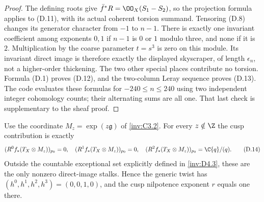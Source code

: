 \begin{proof}
The defining roots give $\bar f^*R=\OO_X(S_1-S_2)$, so the projection
formula applies to (D.11), with its actual coherent torsion summand.
Tensoring (D.8) changes its generator character from $-1$ to $n-1$.
There is exactly one invariant coefficient among exponents $0,1$ if
$n-1$ is $0$ or $1$ modulo three, and none if it is $2$. Multiplication
by the coarse parameter $t=s^3$ is zero on this module. Its invariant
direct image is therefore exactly the displayed skyscraper, of
length $\epsilon_n$, not a higher-order thickening. The two other
special places contribute no torsion. Formula (D.1) proves (D.12),
and the two-column Leray sequence proves (D.13). The code evaluates
these formulas for $-240\le n\le240$ using two independent integer
cohomology counts; their alternating sums are all one. That last
check is supplementary to the sheaf proof.
\end{proof}

\begin{proposition}\label{inv:D4.2}
Use the coordinate $M_z=\exp(z\mathfrak g)$ of \ref{inv:C3.2}. For every
$z\notin\Z$ the cusp contribution is exactly
\[
 (R^0f_*(T_X\otimes M_z))_{p_0}=0,\quad
 (R^1f_*(T_X\otimes M_z))_{p_0}=0,\quad
 (R^2f_*(T_X\otimes M_z))_{p_0}=\C\{q\}/(q).           \tag{D.14}
\]
Outside the countable exceptional set explicitly defined in \ref{inv:D4.3},
these are the only nonzero direct-image stalks. Hence the generic
twist has $(h^0,h^1,h^2,h^3)=(0,0,1,0)$, and the cusp nilpotence exponent $r$ equals one there.
\end{proposition}

